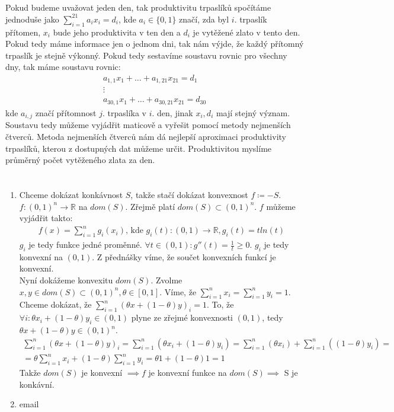 \documentclass[10pt, a4paper]{article}
\begin{document}
\section{}
Pokud budeme uvažovat jeden den, tak produktivitu trpaslíků spočítáme jednoduše jako $\sum^{21}_{i=1} a_i x_i = d_i$, kde $a_i \in \{0,1\}$ značí, zda byl $i$. trpaslík přítomen, $x_i$ bude jeho produktivita v ten den a $d_i$ je vytěžené zlato v tento den. Pokud tedy máme informace jen o jednom dni, tak nám výjde, že každý přítomný trpaslík je stejně výkonný. Pokud tedy sestavíme soustavu rovnic pro všechny dny, tak máme soustavu rovnic:
\begin{gather*}
a_{1,1}x_1 + \dots + a_{1,21}x_{21} = d_1\\
\vdots\\
a_{30,1}x_1 + \dots + a_{30,21}x_{21} = d_{30}
\end{gather*}
kde $a_{i,j}$ značí přítomnost $j$. trpaslíka v $i$. den, jinak $x_i, d_i$ mají stejný význam. Soustavu tedy můžeme vyjádřit maticově a vyřešit pomocí metody nejmenších čtverců. Metoda nejmenších čtverců nám dá nejlepší aproximaci produktivity trpaslíků, kterou z dostupných dat můžeme určit. Produktivitou myslíme průměrný počet vytěženého zlata za den.

\section{}
\begin{enumerate}[label=\alph*)]
\item Chceme dokázat konkávnost $S$, takže stačí dokázat konvexnost $f \coloneqq -S$. $f: (0,1)^n \rightarrow \mathbb{R}$ na $dom(S)$. Zřejmě platí $dom(S) \subset (0,1)^n$. $f$ můžeme vyjádřit takto:
\begin{gather*}
f(x) = \sum^{n}_{i=1} g_i(x_i) \text{, kde } g_i(t): (0,1) \rightarrow \mathbb{R}, g_i(t) = tln(t)
\end{gather*}
$g_i$ je tedy funkce jedné proměnné. $\forall t \in (0,1): g''(t)=\frac{1}{t} \geq 0$. $g_i$ je tedy konvexní na $(0,1)$. Z přednášky víme, že součet konvexních funkcí je konvexní.\\
Nyní dokážeme konvexitu $dom(S)$. Zvolme $x,y \in dom(S) \subset (0,1)^n, \theta \in [0,1]$. Víme, že $\sum^n_{i=1} x_i = \sum^n_{i=1} y_i = 1$. Chceme dokázat, že $\sum^n_{i=1} (\theta x + (1-\theta)y)_i = 1$. To, že $\forall i: \theta x_i + (1-\theta) y_i \in (0,1)$ plyne ze zřejmé konvexnosti $(0,1)$, tedy $\theta x + (1-\theta)y \in (0,1)^n$. 
\begin{gather*}
\sum^n_{i=1} (\theta x + (1-\theta)y)_i = \sum^n_{i=1}(\theta x_i + (1-\theta)y_i)  = \sum^n_{i=1}(\theta x_i) + \sum^n_{i=1}((1-\theta)y_i) = \\
= \theta \sum^n_{i=1} x_i + (1-\theta)\sum^n_{i=1} y_i = \theta 1 + (1-\theta)1 = 1
\end{gather*}
Takže $dom(S)$ je konvexní $\implies f$ je konvexní funkce na $dom(S) \implies$ S je konkávní.
\item email
\end{enumerate}
\end{document}

